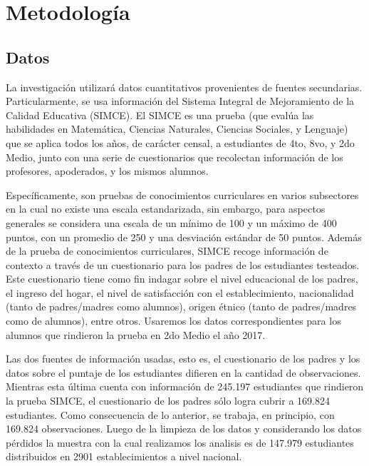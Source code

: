 \documentclass[
]{article}
\begin{document}
\hypertarget{metodologuxeda}{%
\section{Metodología}\label{metodologuxeda}}

\hypertarget{datos}{%
\subsection{Datos}\label{datos}}

La investigación utilizará datos cuantitativos provenientes de fuentes
secundarias. Particularmente, se usa información del Sistema Integral de
Mejoramiento de la Calidad Educativa (SIMCE). El SIMCE es una prueba
(que evalúa las habilidades en Matemática, Ciencias Naturales, Ciencias
Sociales, y Lenguaje) que se aplica todos los años, de carácter censal,
a estudiantes de 4to, 8vo, y 2do Medio, junto con una serie de
cuestionarios que recolectan información de los profesores, apoderados,
y los mismos alumnos.

Específicamente, son pruebas de conocimientos curriculares en varios
subsectores en la cual no existe una escala estandarizada, sin embargo,
para aspectos generales se considera una escala de un mínimo de 100 y un
máximo de 400 puntos, con un promedio de 250 y una desviación estándar
de 50 puntos. Además de la prueba de conocimientos curriculares, SIMCE
recoge información de contexto a través de un cuestionario para los
padres de los estudiantes testeados. Este cuestionario tiene como fin
indagar sobre el nivel educacional de los padres, el ingreso del hogar,
el nivel de satisfacción con el establecimiento, nacionalidad (tanto de
padres/madres como alumnos), origen étnico (tanto de padres/madres como
de alumnos), entre otros. Usaremos los datos correspondientes para los
alumnos que rindieron la prueba en 2do Medio el año 2017.

Las dos fuentes de información usadas, esto es, el cuestionario de los
padres y los datos sobre el puntaje de los estudiantes difieren en la
cantidad de observaciones. Mientras esta última cuenta con información
de 245.197 estudiantes que rindieron la prueba SIMCE, el cuestionario de
los padres sólo logra cubrir a 169.824 estudiantes. Como consecuencia de
lo anterior, se trabaja, en principio, con 169.824 observaciones. Luego
de la limpieza de los datos y considerando los datos pérdidos la muestra
con la cual realizamos los analisis es de 147.979 estudiantes
distribuidos en 2901 establecimientos a nivel nacional.
\end{document}

